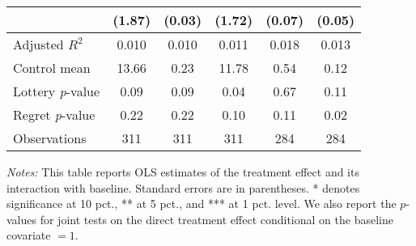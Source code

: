 \begin{table}[h]
{\begin{threeparttable}
\begin{tabular}{l*{5}{c}}
                &   (1.87)         &   (0.03)         &   (1.72)         &   (0.07)         &   (0.05)         \\
\midrule
Adjusted \(R^{2}\)&    0.010         &    0.010         &    0.011         &    0.018         &    0.013         \\
Control mean    &    13.66         &     0.23         &    11.78         &     0.54         &     0.12         \\
Lottery \emph{p}-value&     0.09         &     0.09         &     0.04         &     0.67         &     0.11         \\
Regret \emph{p}-value&     0.22         &     0.22         &     0.10         &     0.11         &     0.02         \\
Observations    &      311         &      311         &      311         &      284         &      284         \\
\bottomrule \end{tabular} \begin{tablenotes}[flushleft] \footnotesize \item \emph{Notes:} This table reports OLS estimates of the treatment effect and its interaction with baseline. Standard errors are in parentheses. * denotes significance at 10 pct., ** at 5 pct., and *** at 1 pct. level. We also report the \(p\)-values for joint tests on the direct treatment effect conditional on the baseline covariate $= 1$. \end{tablenotes} \end{threeparttable} } \end{table}


